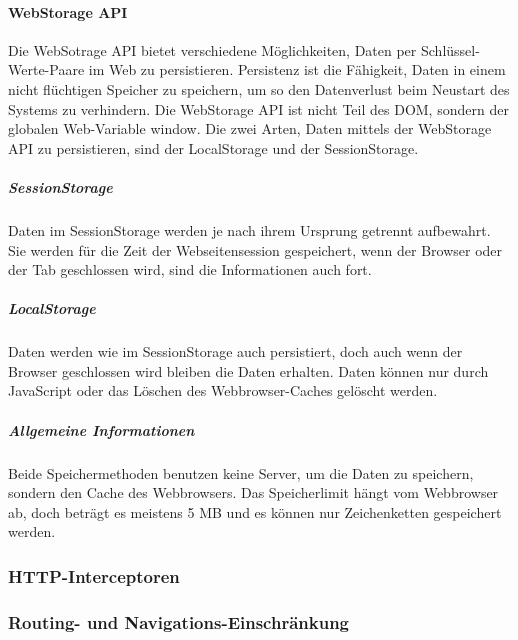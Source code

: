 \paragraph{WebStorage API}
\label{par:impl:usermanagment:WebStorage}
Die WebSotrage API bietet verschiedene Möglichkeiten, Daten per Schlüssel-Werte-Paare im Web zu persistieren. Persistenz ist die Fähigkeit, Daten in einem nicht flüchtigen Speicher zu speichern, um so den Datenverlust beim Neustart des Systems zu verhindern. Die WebStorage API ist nicht Teil des DOM, sondern der globalen Web-Variable window. Die zwei Arten, Daten mittels der WebStorage API zu persistieren, sind der LocalStorage und der SessionStorage.
\cite{WikiPersistenzDefinition} \cite{WebStorageAPI}


\subparagraph{SessionStorage}
Daten im SessionStorage werden je nach ihrem Ursprung getrennt aufbewahrt. Sie werden für die Zeit der Webseitensession gespeichert, wenn der Browser oder der Tab geschlossen wird, sind die Informationen auch fort.
\cite{WebStorageAPI}

\subparagraph{LocalStorage}
Daten werden wie im SessionStorage auch persistiert, doch auch wenn der Browser geschlossen wird bleiben die Daten erhalten. Daten können nur durch JavaScript oder das Löschen des Webbrowser-Caches gelöscht werden.
\cite{WebStorageAPI}

\subparagraph{Allgemeine Informationen}
Beide Speichermethoden benutzen keine Server, um die Daten zu speichern, sondern den Cache des Webbrowsers. Das Speicherlimit hängt vom Webbrowser ab, doch beträgt es meistens 5 MB und es können nur Zeichenketten gespeichert werden.
\cite{WebStorageAPI}

\subsubsection{HTTP-Interceptoren}

\subsubsection{Routing- und Navigations-Einschränkung}